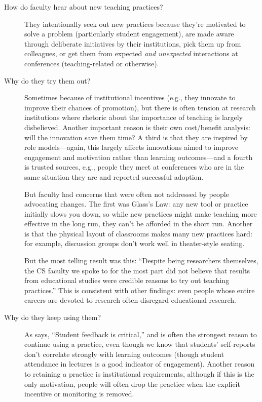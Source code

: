 \begin{description}

\item[How do faculty hear about new teaching practices?]
  They intentionally seek out new practices
  because they're motivated to solve a problem (particularly student engagement),
  are made aware through deliberate initiatives by their institutions,
  pick them up from colleagues,
  or get them from expected \emph{and unexpected} interactions at conferences
  (teaching-related or otherwise).

\item[Why do they try them out?]
  Sometimes because of institutional incentives
  (e.g., they innovate to improve their chances of promotion),
  but there is often tension at research institutions
  where rhetoric about the importance of teaching is largely disbelieved.
  Another important reason is their own cost/benefit analysis:
  will the innovation save them time?
  A third is that they are inspired by role models---again,
  this largely affects innovations aimed to improve engagement and motivation
  rather than learning outcomes---and a fourth is trusted sources,
  e.g.,
  people they meet at conferences who are in the same situation they are
  and reported successful adoption.

  But faculty had concerns that were often not addressed by people advocating changes.
  The first was Glass's Law:
  any new tool or practice initially slows you down,
  so while new practices might make teaching more effective in the long run,
  they can't be afforded in the short run.
  Another is that the physical layout of classrooms makes many new practices hard:
  for example,
  discussion groups don't work well in theater-style seating.

  But the most telling result was this:
  ``Despite being researchers themselves,
  the CS faculty we spoke to for the most part did not believe that
  results from educational studies were credible reasons to try out teaching practices.''
  This is consistent with other findings:
  even people whose entire careers are devoted to research often disregard educational research.

\item[Why do they keep using them?]
  As \cite{Bark2015} says, ``Student feedback is critical,''
  and is often the strongest reason to continue using a practice,
  even though we know that students' self-reports don't correlate strongly with learning outcomes \cite{Star2014,Uttl2017}
  (though student attendance in lectures is a good indicator of engagement).
  Another reason to retaining a practice is institutional requirements,
  although if this is the only motivation,
  people will often drop the practice
  when the explicit incentive or monitoring is removed.

\end{description}

